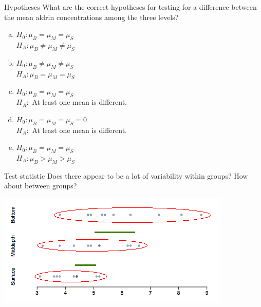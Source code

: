 \documentclass[
  ignorenonframetext,
]{beamer}
\begin{document}
\begin{frame}{Hypotheses}
\protect\hypertarget{hypotheses-1}{}
\alert{What are the correct hypotheses for testing for a difference between the mean aldrin concentrations among the three levels?}

\begin{enumerate}[(a)]
\item $H_0: \mu_B = \mu_M = \mu_S$ \\
$H_A: \mu_B \ne \mu_M \ne \mu_S$ \\
\item $H_0: \mu_B \ne \mu_ M \ne \mu_S$ \\
$H_A: \mu_B = \mu_M = \mu_S$ \\
\item \alert{$H_0: \mu_B = \mu_M = \mu_S$} \\
\alert{$H_A:$ At least one mean is different.}
\item $H_0: \mu_B = \mu_M = \mu_S = 0$ \\
$H_A:$ At least one mean is different.
\item $H_0: \mu_B = \mu_M = \mu_S$ \\
$H_A: \mu_B > \mu_M > \mu_S$ \\
\end{enumerate}
\end{frame}

\begin{frame}{Test statistic}
\protect\hypertarget{test-statistic}{}
\alert{Does there appear to be a lot of variability within groups? How about between groups?}


\includegraphics[width=\textwidth,height=0.4\textheight]{images/dotplot_var.png}
\end{frame}
\end{document}
